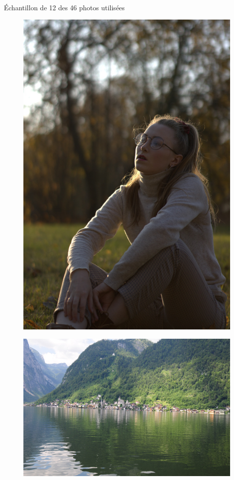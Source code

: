\documentclass[xcolor=dvipsnames]{beamer}
\begin{document}
\begin{frame}{Échantillon de 12 des 46 photos utilisées}
\begin{minipage}{.23\textwidth}
\begin{figure}
            \includegraphics[width=.75\linewidth]{photos_utilises/25.jpg}
        \end{figure}
        \begin{figure}
            \includegraphics[width=1\linewidth]{photos_utilises/17.jpg}
        \end{figure}
        \begin{figure}

\end{figure}
\end{minipage}
\end{frame}
\end{document}
